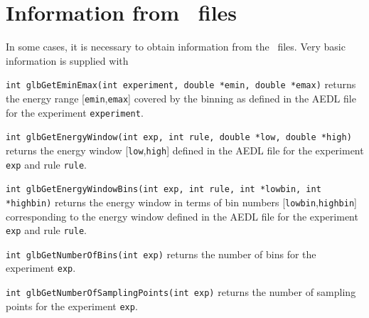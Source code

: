 \section{Information from \AEDL\ files}
\label{sec:aedl_names}

In some cases, it is necessary to obtain information from the \AEDL\
files. Very basic information is supplied with
\begin{function}
{\tt int glbGetEminEmax(int experiment, double *emin, double *emax)} returns the
energy range [{\tt emin},{\tt emax}] covered by the binning as defined in the AEDL file for the experiment
{\tt experiment}.
\end{function}
\begin{function}
{\tt int glbGetEnergyWindow(int exp, int rule, double *low, double *high)} returns the
energy window [{\tt low},{\tt high}] defined in the AEDL file for the experiment
{\tt exp} and rule {\tt rule}.
\end{function}
\begin{function}
{\tt int glbGetEnergyWindowBins(int exp, int rule, int *lowbin, int *highbin)} returns the
energy window in terms of bin numbers [{\tt lowbin},{\tt highbin}] corresponding to the energy window defined in the AEDL file for the experiment {\tt exp} and rule {\tt rule}.
\end{function}
\begin{function}
{\tt int glbGetNumberOfBins(int exp)} returns the number of bins for the experiment {\tt exp}.
\end{function}
\begin{function}
{\tt int glbGetNumberOfSamplingPoints(int exp)} returns the number of sampling points for the experiment {\tt exp}.
\end{function}

